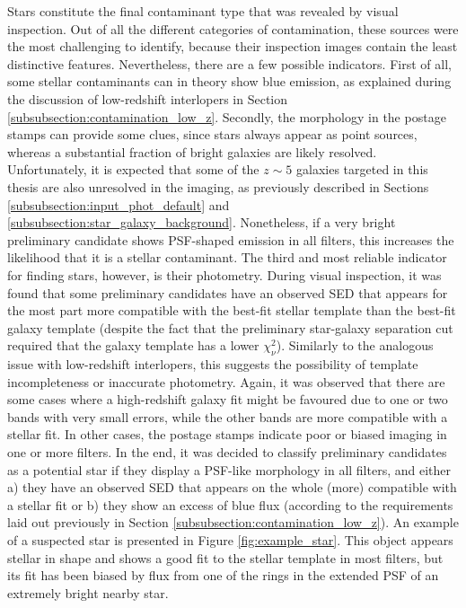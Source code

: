 Stars constitute the final contaminant type that was revealed by visual inspection. Out of all the different categories of contamination, these sources were the most challenging to identify, because their inspection images contain the least distinctive features. Nevertheless, there are a few possible indicators. First of all, some stellar contaminants can in theory show blue emission, as explained during the discussion of low-redshift interlopers in Section \ref{subsubsection:contamination_low_z}. Secondly, the morphology in the postage stamps can provide some clues, since stars always appear as point sources, whereas a substantial fraction of bright galaxies are likely resolved. Unfortunately, it is expected that some of the $z\sim5$ galaxies targeted in this thesis are also unresolved in the \DESVIDEO imaging, as previously described in  Sections \ref{subsubsection:input_phot_default} and  \ref{subsubsection:star_galaxy_background}. Nonetheless, if a very bright preliminary candidate shows PSF-shaped emission in all filters, this increases the likelihood that it is a stellar contaminant. The third and most reliable indicator for finding stars, however, is their photometry. During visual inspection, it was found that some preliminary candidates have an observed SED that appears for the most part more compatible with the best-fit stellar template than the best-fit galaxy template (despite the fact that the preliminary star-galaxy separation cut required that the galaxy template has a lower $\chi^2_{\nu}$). Similarly to the analogous issue with low-redshift interlopers, this suggests the possibility of template incompleteness or inaccurate photometry. Again, it was observed that there are some cases where a high-redshift galaxy fit might be favoured due to one or two bands with very small errors, while the other bands are more compatible with a stellar fit. In other cases, the postage stamps indicate poor or biased imaging in one or more filters. In the end, it was decided to classify preliminary candidates as a potential star if they display a PSF-like morphology in all filters, and either a) they have an observed SED that appears on the whole (more) compatible with a stellar fit or b) they show an excess of blue flux (according to the requirements laid out previously in Section \ref{subsubsection:contamination_low_z}). An example of a suspected star is presented in Figure \ref{fig:example_star}. This object appears stellar in shape and shows a good fit to the stellar template in most filters, but its fit has been biased by flux from one of the rings in the extended PSF of an extremely bright nearby star. \par 



